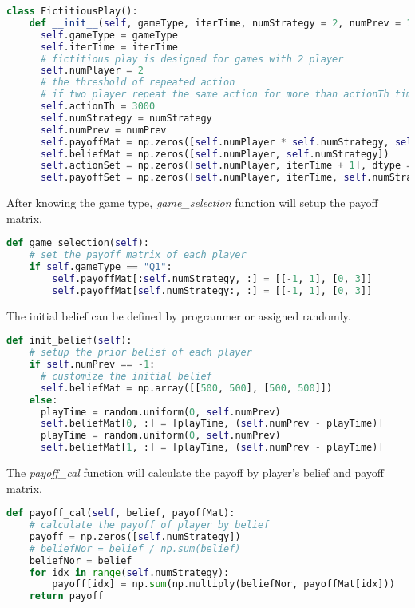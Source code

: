 \documentclass[a4paper, oneside, final, 12pt]{scrartcl} %
\begin{document}
\begin{lstlisting}[language=Python]
  class FictitiousPlay():
    def __init__(self, gameType, iterTime, numStrategy = 2, numPrev = 1000):
      self.gameType = gameType
      self.iterTime = iterTime
      # fictitious play is designed for games with 2 player
      self.numPlayer = 2
      # the threshold of repeated action
      # if two player repeat the same action for more than actionTh times, stop the iteration
      self.actionTh = 3000
      self.numStrategy = numStrategy
      self.numPrev = numPrev
      self.payoffMat = np.zeros([self.numPlayer * self.numStrategy, self.numStrategy])
      self.beliefMat = np.zeros([self.numPlayer, self.numStrategy])
      self.actionSet = np.zeros([self.numPlayer, iterTime + 1], dtype = np.uint8)
      self.payoffSet = np.zeros([self.numPlayer, iterTime, self.numStrategy])
\end{lstlisting}

After knowing the game type, \emph{game\_selection} function will setup the payoff matrix.

\begin{lstlisting}[language=Python]
  def game_selection(self):
    # set the payoff matrix of each player
    if self.gameType == "Q1":
        self.payoffMat[:self.numStrategy, :] = [[-1, 1], [0, 3]]
        self.payoffMat[self.numStrategy:, :] = [[-1, 1], [0, 3]]
\end{lstlisting}

\newpage

The initial belief can be defined by programmer or assigned randomly.

\begin{lstlisting}[language=Python]
  def init_belief(self):
    # setup the prior belief of each player
    if self.numPrev == -1:
      # customize the initial belief
      self.beliefMat = np.array([[500, 500], [500, 500]])
    else:
      playTime = random.uniform(0, self.numPrev)
      self.beliefMat[0, :] = [playTime, (self.numPrev - playTime)]
      playTime = random.uniform(0, self.numPrev)
      self.beliefMat[1, :] = [playTime, (self.numPrev - playTime)]
\end{lstlisting}

The \emph{payoff\_cal} function will calculate the payoff by player's belief and payoff matrix.

\begin{lstlisting}[language=Python]
  def payoff_cal(self, belief, payoffMat):
    # calculate the payoff of player by belief
    payoff = np.zeros([self.numStrategy])
    # beliefNor = belief / np.sum(belief)
    beliefNor = belief
    for idx in range(self.numStrategy):
        payoff[idx] = np.sum(np.multiply(beliefNor, payoffMat[idx]))
    return payoff
\end{lstlisting}
\end{document}
